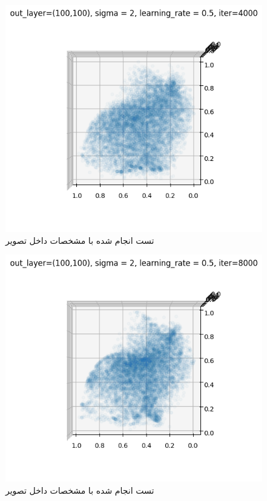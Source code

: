 \documentclass{article}
\begin{document}
\begin{figure}[!h]
    \centering\includegraphics[scale=.65]{./p1-12}
    \caption{تست انجام شده با مشخصات داخل تصویر}\label{fig.112}
\end{figure}

\begin{figure}[!h]
    \centering\includegraphics[scale=.65]{./p1-13}
    \caption{تست انجام شده با مشخصات داخل تصویر}\label{fig.113}
\end{figure}
\end{document}
